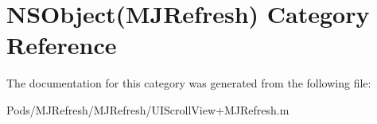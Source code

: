\hypertarget{category_n_s_object_07_m_j_refresh_08}{}\section{N\+S\+Object(M\+J\+Refresh) Category Reference}
\label{category_n_s_object_07_m_j_refresh_08}


The documentation for this category was generated from the following file\+:\begin{DoxyCompactItemize}
\item 
Pods/\+M\+J\+Refresh/\+M\+J\+Refresh/U\+I\+Scroll\+View+\+M\+J\+Refresh.\+m\end{DoxyCompactItemize}
